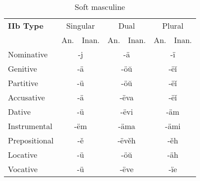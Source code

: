 \begin{table}[!htb]
	\caption{Soft masculine}
	\begin{tabular}{lllllll}
		\textbf{IIb Type}       
		& \multicolumn{2}{c}{Singular} 
		& \multicolumn{2}{c}{Dual} 
		& \multicolumn{2}{c}{Plural} \\
		& An.   & Inan.  & An.   & Inan.   & An.  & Inan. \\
		Nominative    & \multicolumn{2}{c}{-j}      
		& \multicolumn{2}{c}{-ä}        
		& \multicolumn{2}{c}{-ï} \\
		Genitive      & \multicolumn{2}{c}{-ä}       
		& \multicolumn{2}{c}{-öŭ}      
		& \multicolumn{2}{c}{-ëǐ}   \\
		Partitive     & \multicolumn{2}{c}{-ü}       
		& \multicolumn{2}{c}{-öŭ}      
		& \multicolumn{2}{c}{-ëǐ} \\
		Accusative    & \multicolumn{2}{c}{-ä}     
		& \multicolumn{2}{c}{-ëva} 
		& \multicolumn{2}{c}{-ëǐ} \\
		Dative		  & \multicolumn{2}{c}{-ü}       
		& \multicolumn{2}{c}{-ëvi}     
		& \multicolumn{2}{c}{-äm} \\
		Instrumental  & \multicolumn{2}{c}{-ëm}     
		& \multicolumn{2}{c}{-äma}     
		& \multicolumn{2}{c}{-ämi} \\
		Prepositional & \multicolumn{2}{c}{-ě}       
		& \multicolumn{2}{c}{-ëvěh}     
		& \multicolumn{2}{c}{-ěh} \\
		Locative      & \multicolumn{2}{c}{-ü}      
		& \multicolumn{2}{c}{-öŭ}       
		& \multicolumn{2}{c}{-äh} \\ 
		Vocative      & \multicolumn{2}{c}{-ü}       
		& \multicolumn{2}{c}{-ëve}      
		& \multicolumn{2}{c}{-ïe}
	\end{tabular}
\end{table}



